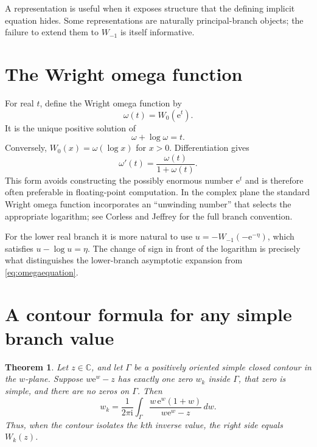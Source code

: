 \documentclass[11pt,oneside]{book}
\newtheorem{theorem}{Theorem}[chapter]
\theoremstyle{definition}
\theoremstyle{remark}
\newcommand{\ee}{\mathrm e}
\newcommand{\ii}{\mathrm i}
\newcommand{\C}{\mathbb C}
\begin{document}
A representation is useful when it exposes structure that the defining
implicit equation hides.  Some representations are naturally principal-branch
objects; the failure to extend them to $W_{-1}$ is itself informative.

\section{The Wright omega function}

For real $t$, define the Wright omega function by
\begin{equation}\label{eq:wrightomega}
 \omega(t)=W_0(\ee^t).
\end{equation}
It is the unique positive solution of
\begin{equation}\label{eq:omegaequation}
 \omega+\log\omega=t.
\end{equation}
Conversely, $W_0(x)=\omega(\log x)$ for $x>0$.  Differentiation gives
\begin{equation}\label{eq:omegaderivative}
 \omega'(t)=\frac{\omega(t)}{1+\omega(t)}.
\end{equation}
This form avoids constructing the possibly enormous number $\ee^t$ and is
therefore often preferable in floating-point computation.  In the complex
plane the standard Wright omega function incorporates an ``unwinding
number'' that selects the appropriate logarithm; see Corless and Jeffrey for
the full branch convention.

For the lower real branch it is more natural to use
$u=-W_{-1}(-\ee^{-\eta})$, which satisfies
$u-\log u=\eta$.  The change of sign in front of the logarithm is precisely
what distinguishes the lower-branch asymptotic expansion from
\eqref{eq:omegaequation}.

\section{A contour formula for any simple branch value}

\begin{theorem}\label{thm:contourW}
Let $z\in\C$, and let $\Gamma$ be a positively oriented simple closed contour
in the $w$-plane.  Suppose $w\ee^w-z$ has exactly one zero $w_k$ inside
$\Gamma$, that zero is simple, and there are no zeros on $\Gamma$.  Then
\begin{equation}\label{eq:contourW}
 w_k=\frac{1}{2\pi\ii}
 \int_\Gamma
 \frac{w\,\ee^w(1+w)}{w\ee^w-z}\,dw.
\end{equation}
Thus, when the contour isolates the $k$th inverse value, the right side equals
$W_k(z)$.
\end{theorem}
\end{document}
